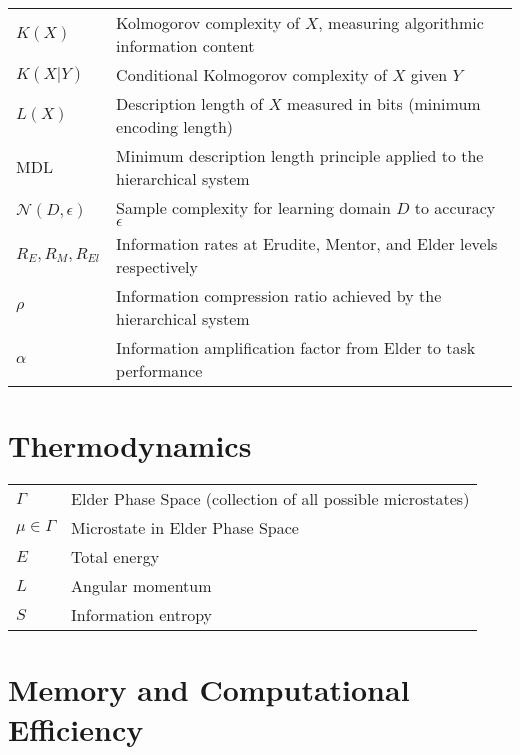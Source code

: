 \begin{tabular}{p{3cm} p{12cm}}
$K(X)$ & Kolmogorov complexity of $X$, measuring algorithmic information content \\
$K(X|Y)$ & Conditional Kolmogorov complexity of $X$ given $Y$ \\
$L(X)$ & Description length of $X$ measured in bits (minimum encoding length) \\
$\text{MDL}$ & Minimum description length principle applied to the hierarchical system \\
$\mathcal{N}(D, \epsilon)$ & Sample complexity for learning domain $D$ to accuracy $\epsilon$ \\
$R_E, R_M, R_{El}$ & Information rates at Erudite, Mentor, and Elder levels respectively \\
$\rho$ & Information compression ratio achieved by the hierarchical system \\
$\alpha$ & Information amplification factor from Elder to task performance \\
\end{tabular}

\section*{Thermodynamics}

\begin{tabular}{p{3cm} p{12cm}}
$\Gamma$ & Elder Phase Space (collection of all possible microstates) \\
$\mu \in \Gamma$ & Microstate in Elder Phase Space \\
$E$ & Total energy \\
$L$ & Angular momentum \\
$S$ & Information entropy \\
\end{tabular}

\section*{Memory and Computational Efficiency}

